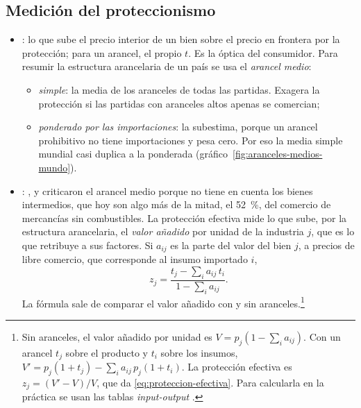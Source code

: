 \documentclass[11pt]{article}
\begin{document}
\subsection{Medición del proteccionismo}\label{sec:medicion-proteccion}

\begin{itemize}
\item {}: lo que sube el precio interior de un bien sobre el precio en frontera por la protección; para un arancel, el propio $t$. Es la óptica del consumidor. Para resumir la estructura arancelaria de un país se usa el \emph{arancel medio}:
  \begin{itemize}
  \item \emph{simple}: la media de los aranceles de todas las partidas. Exagera la protección si las partidas con aranceles altos apenas se comercian;
  \item \emph{ponderado por las importaciones}: la subestima, porque un arancel prohibitivo no tiene importaciones y pesa cero. Por eso la media simple mundial casi duplica a la ponderada (gráfico~\ref{fig:aranceles-medios-mundo}).
  \end{itemize}
\item {}: \textcite{Corden1966Structure}, \textcite{Balassa1965Tariff} y \textcite{Johnson1965Theory} criticaron el arancel medio porque no tiene en cuenta los bienes intermedios, que hoy son algo más de la mitad, el 52~\%, del comercio de mercancías sin combustibles\nocite{OMC2024BienesIntermedios}. La protección efectiva mide lo que sube, por la estructura arancelaria, el \emph{valor añadido} por unidad de la industria $j$, que es lo que retribuye a sus factores. Si $a_{ij}$ es la parte del valor del bien $j$, a precios de libre comercio, que corresponde al insumo importado $i$,
  \begin{equation}\label{eq:proteccion-efectiva}
  z_j=\frac{t_j-\sum_i a_{ij}\,t_i}{1-\sum_i a_{ij}}.
  \end{equation}
  La fórmula sale de comparar el valor añadido con y sin aranceles.\footnote{Sin aranceles, el valor añadido por unidad es $V=p_j\left(1-\sum_i a_{ij}\right)$. Con un arancel $t_j$ sobre el producto y $t_i$ sobre los insumos, $V'=p_j(1+t_j)-\sum_i a_{ij}\,p_j(1+t_i)$. La protección efectiva es $z_j=(V'-V)/V$, que da \eqref{eq:proteccion-efectiva}. Para calcularla en la práctica se usan las tablas \emph{input-output} .}
  \begin{itemize}

\end{itemize}
\end{itemize}
\end{document}
